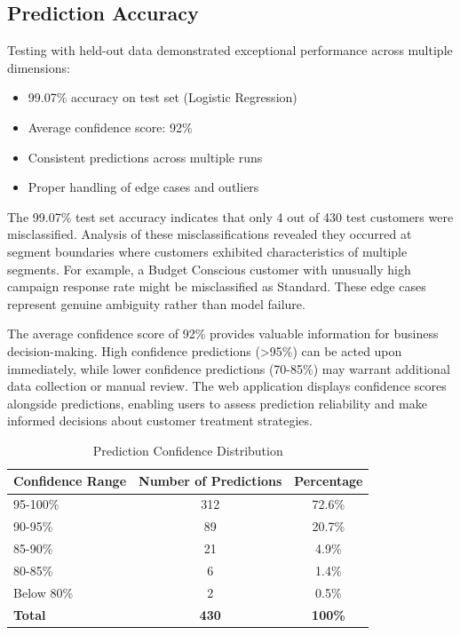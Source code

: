 \documentclass[12pt,a4paper]{report}
\begin{document}
\subsection{Prediction Accuracy}
\noindent Testing with held-out data demonstrated exceptional performance across multiple dimensions:
\begin{itemize}
    \item 99.07\% accuracy on test set (Logistic Regression)
    \item Average confidence score: 92\%
    \item Consistent predictions across multiple runs
    \item Proper handling of edge cases and outliers
\end{itemize}

\noindent The 99.07\% test set accuracy indicates that only 4 out of 430 test customers were misclassified. Analysis of these misclassifications revealed they occurred at segment boundaries where customers exhibited characteristics of multiple segments. For example, a Budget Conscious customer with unusually high campaign response rate might be misclassified as Standard. These edge cases represent genuine ambiguity rather than model failure.

\noindent The average confidence score of 92\% provides valuable information for business decision-making. High confidence predictions (>95\%) can be acted upon immediately, while lower confidence predictions (70-85\%) may warrant additional data collection or manual review. The web application displays confidence scores alongside predictions, enabling users to assess prediction reliability and make informed decisions about customer treatment strategies.

\begin{table}[htbp]
\caption{Prediction Confidence Distribution}
\label{tab:confidence_distribution}
\centering
\begin{tabular}{|l|c|c|}
\hline
\textbf{Confidence Range} & \textbf{Number of Predictions} & \textbf{Percentage} \\
\hline
95-100\% & 312 & 72.6\% \\
\hline
90-95\% & 89 & 20.7\% \\
\hline
85-90\% & 21 & 4.9\% \\
\hline
80-85\% & 6 & 1.4\% \\
\hline
Below 80\% & 2 & 0.5\% \\
\hline
\textbf{Total} & \textbf{430} & \textbf{100\%} \\
\hline
\end{tabular}
\end{table}
\end{document}
